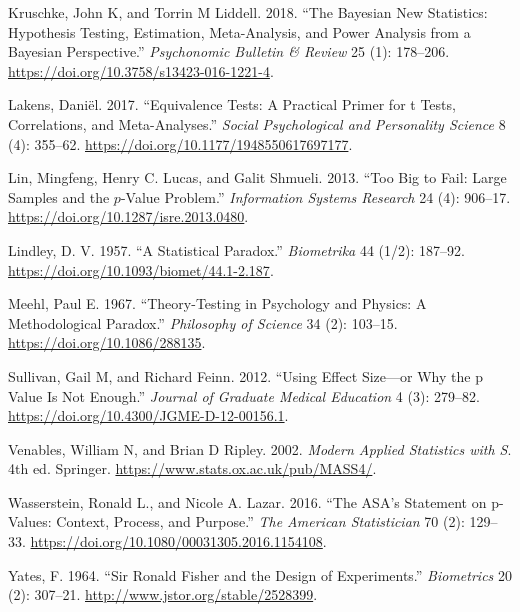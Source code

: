 \documentclass[
  11pt,
  letterpaper,
]{article}
\newlength{\cslhangindent}
\newenvironment{CSLReferences}[2] %
 {\begin{list}{}{%
  \setlength{\itemindent}{0pt}
  \setlength{\leftmargin}{0pt}
  \setlength{\parsep}{0pt}
  \ifodd #1
   \setlength{\leftmargin}{\cslhangindent}
   \setlength{\itemindent}{-1\cslhangindent}
  \fi
  \setlength{\itemsep}{#2\baselineskip}}}
 {\end{list}}
\begin{document}
\begin{CSLReferences}{1}{1}
Kruschke, John K, and Torrin M Liddell. 2018. {``The Bayesian New
Statistics: Hypothesis Testing, Estimation, Meta-Analysis, and Power
Analysis from a Bayesian Perspective.''} \emph{Psychonomic Bulletin \&
Review} 25 (1): 178--206.
\url{https://doi.org/10.3758/s13423-016-1221-4}.

Lakens, Daniël. 2017. {``Equivalence Tests: A Practical Primer for t
Tests, Correlations, and Meta-Analyses.''} \emph{Social Psychological
and Personality Science} 8 (4): 355--62.
\url{https://doi.org/10.1177/1948550617697177}.

Lin, Mingfeng, Henry C. Lucas, and Galit Shmueli. 2013. {``Too Big to
Fail: Large Samples and the \(p\)-Value Problem.''} \emph{Information
Systems Research} 24 (4): 906--17.
\url{https://doi.org/10.1287/isre.2013.0480}.

Lindley, D. V. 1957. {``A Statistical Paradox.''} \emph{Biometrika} 44
(1/2): 187--92. \url{https://doi.org/10.1093/biomet/44.1-2.187}.

Meehl, Paul E. 1967. {``Theory-Testing in Psychology and Physics: A
Methodological Paradox.''} \emph{Philosophy of Science} 34 (2): 103--15.
\url{https://doi.org/10.1086/288135}.

Sullivan, Gail M, and Richard Feinn. 2012. {``Using Effect Size---or Why
the p Value Is Not Enough.''} \emph{Journal of Graduate Medical
Education} 4 (3): 279--82.
\url{https://doi.org/10.4300/JGME-D-12-00156.1}.

Venables, William N, and Brian D Ripley. 2002. \emph{Modern Applied
Statistics with {S}}. 4th ed. Springer.
\url{https://www.stats.ox.ac.uk/pub/MASS4/}.

Wasserstein, Ronald L., and Nicole A. Lazar. 2016. {``The ASA's
Statement on p-Values: Context, Process, and Purpose.''} \emph{The
American Statistician} 70 (2): 129--33.
\url{https://doi.org/10.1080/00031305.2016.1154108}.

Yates, F. 1964. {``Sir Ronald Fisher and the Design of Experiments.''}
\emph{Biometrics} 20 (2): 307--21.
\url{http://www.jstor.org/stable/2528399}.

\end{CSLReferences}
\end{document}
